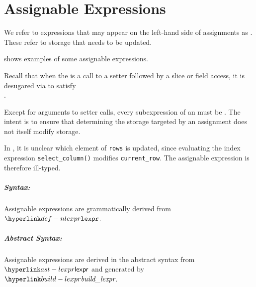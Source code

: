 \chapter{Assignable Expressions\label{chap:AssignableExpressions}}

\hypertarget{def-assignableexpression}{}
We refer to expressions that may appear on the left-hand side of assignments as \assignableexpressions.
These refer to storage that needs to be updated.

 shows examples of some assignable expressions.

Recall that when the \assignableexpression{} is a call to a setter
followed by a slice or field access, it is desugared via 
to satisfy \\ .

Except for arguments to setter calls, every subexpression of an
\assignableexpression{} must be \readonlyterm{}.
The intent is to ensure that determining the storage targeted by an assignment
does not itself modify storage.

In , it is unclear which element of
\verb|rows| is updated, since evaluating the index expression
\verb|select_column()| modifies \verb|current_row|.
The assignable expression is therefore ill-typed.

\ChapterOutline

\paragraph{Syntax:} Assignable expressions are grammatically derived from $\Nlexpr$.

\paragraph{Abstract Syntax:} Assignable expressions are derived in the abstract syntax from $\lexpr$
  and generated by $\buildlexpr$.

